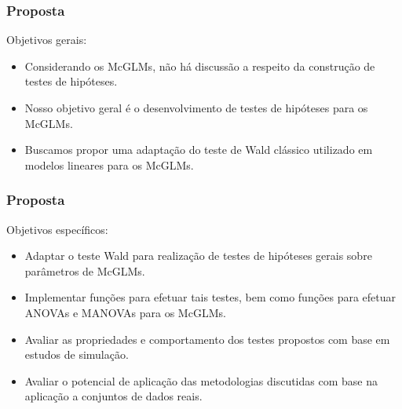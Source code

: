 \documentclass[10pt,
  aspectratio=169,
  serif,
  mathserif,
  professionalfont,
  compress,
  handout,
  ]{beamer}\usepackage[]{graphicx}\usepackage[]{color}
\begin{document}

\begin{frame}
  \frametitle{Proposta}

Objetivos gerais:

  \begin{itemize}
    \itemsep 2ex

  \item Considerando os McGLMs, não há discussão a respeito da construção de testes de hipóteses.
  
  \item Nosso objetivo geral é o desenvolvimento de testes de hipóteses para os McGLMs.

  \item Buscamos propor uma adaptação do teste de Wald clássico utilizado em modelos lineares para os McGLMs. 

  \end{itemize}

\end{frame}


\begin{frame}
  \frametitle{Proposta}

Objetivos específicos: 

  \begin{itemize}
    \itemsep 2ex

  \item Adaptar o teste Wald para realização de testes de hipóteses gerais sobre parâmetros de McGLMs. 
  
  \item Implementar funções para efetuar tais testes, bem como funções para efetuar ANOVAs e MANOVAs para os McGLMs. 

  \item Avaliar as propriedades e comportamento dos testes propostos com base em estudos de simulação.

  \item Avaliar o potencial de aplicação das metodologias discutidas com base na aplicação a conjuntos de dados reais.

  \end{itemize}

\end{frame}

\end{document}
